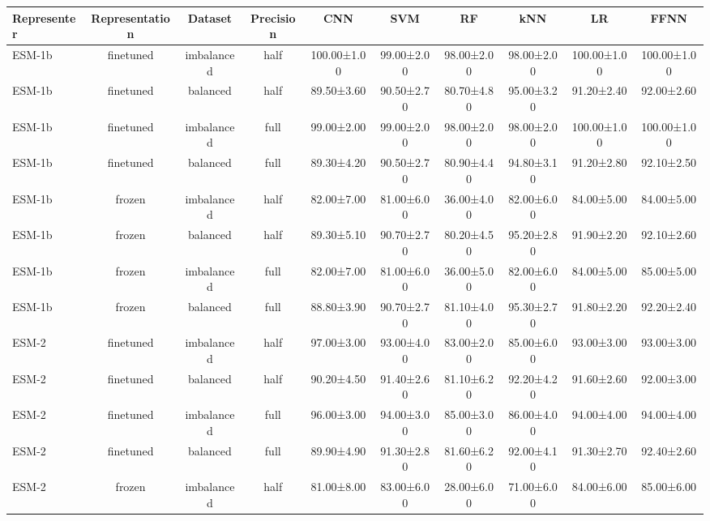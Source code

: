 \begin{tabular}{lccccccccc}
\toprule
 \textbf{Representer} & \textbf{Representation} &    \textbf{Dataset} & \textbf{Precision} &         \textbf{CNN} &        \textbf{SVM} &         \textbf{RF} &        \textbf{kNN} &          \textbf{LR} &        \textbf{FFNN} \\
\midrule
      ESM-1b &      finetuned & imbalanced &      half & 100.00±1.00 & 99.00±2.00 & 98.00±2.00 & 98.00±2.00 & 100.00±1.00 & 100.00±1.00 \\
      ESM-1b &      finetuned &   balanced &      half &  89.50±3.60 & 90.50±2.70 & 80.70±4.80 & 95.00±3.20 &  91.20±2.40 &  92.00±2.60 \\
      ESM-1b &      finetuned & imbalanced &      full &  99.00±2.00 & 99.00±2.00 & 98.00±2.00 & 98.00±2.00 & 100.00±1.00 & 100.00±1.00 \\
      ESM-1b &      finetuned &   balanced &      full &  89.30±4.20 & 90.50±2.70 & 80.90±4.40 & 94.80±3.10 &  91.20±2.80 &  92.10±2.50 \\
      ESM-1b &         frozen & imbalanced &      half &  82.00±7.00 & 81.00±6.00 & 36.00±4.00 & 82.00±6.00 &  84.00±5.00 &  84.00±5.00 \\
      ESM-1b &         frozen &   balanced &      half &  89.30±5.10 & 90.70±2.70 & 80.20±4.50 & 95.20±2.80 &  91.90±2.20 &  92.10±2.60 \\
      ESM-1b &         frozen & imbalanced &      full &  82.00±7.00 & 81.00±6.00 & 36.00±5.00 & 82.00±6.00 &  84.00±5.00 &  85.00±5.00 \\
      ESM-1b &         frozen &   balanced &      full &  88.80±3.90 & 90.70±2.70 & 81.10±4.00 & 95.30±2.70 &  91.80±2.20 &  92.20±2.40 \\
       ESM-2 &      finetuned & imbalanced &      half &  97.00±3.00 & 93.00±4.00 & 83.00±2.00 & 85.00±6.00 &  93.00±3.00 &  93.00±3.00 \\
       ESM-2 &      finetuned &   balanced &      half &  90.20±4.50 & 91.40±2.60 & 81.10±6.20 & 92.20±4.20 &  91.60±2.60 &  92.00±3.00 \\
       ESM-2 &      finetuned & imbalanced &      full &  96.00±3.00 & 94.00±3.00 & 85.00±3.00 & 86.00±4.00 &  94.00±4.00 &  94.00±4.00 \\
       ESM-2 &      finetuned &   balanced &      full &  89.90±4.90 & 91.30±2.80 & 81.60±6.20 & 92.00±4.10 &  91.30±2.70 &  92.40±2.60 \\
       ESM-2 &         frozen & imbalanced &      half &  81.00±8.00 & 83.00±6.00 & 28.00±6.00 & 71.00±6.00 &  84.00±6.00 &  85.00±6.00 \\

\end{tabular}

